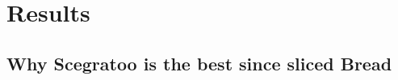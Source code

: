 
\section{Results}\label{results}

\subsection{Why Scegratoo is the best since sliced
Bread}\label{why-scegratoo-is-the-best-since-sliced-bread}
